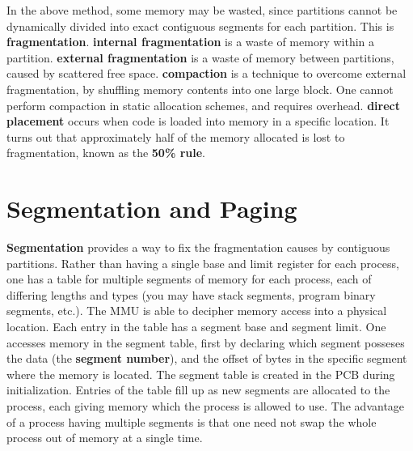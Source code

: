 In the above method, some memory may be wasted, since partitions cannot be dynamically divided into exact contiguous segments for each partition. This is {\bf fragmentation}. {\bf internal fragmentation} is a waste of memory within a partition. {\bf external fragmentation} is a waste of memory between partitions, caused by scattered free space. {\bf compaction} is a technique to overcome external fragmentation, by shuffling memory contents into one large block. One cannot perform compaction in static allocation schemes, and requires overhead. {\bf direct placement} occurs when code is loaded into memory in a specific location. It turns out that approximately half of the memory allocated is lost to fragmentation, known as the {\bf 50\% rule}.

\section{Segmentation and Paging}

{\bf Segmentation} provides a way to fix the fragmentation causes by contiguous partitions. Rather than having a single base and limit register for each process, one has a table for multiple segments of memory for each process, each of differing lengths and types (you may have stack segments, program binary segments, etc.). The MMU is able to decipher memory access into a physical location. Each entry in the table has a segment base and segment limit. One accesses memory in the segment table, first by declaring which segment posseses the data (the {\bf segment number}), and the offset of bytes in the specific segment where the memory is located. The segment table is created in the PCB during initialization. Entries of the table fill up as new segments are allocated to the process, each giving memory which the process is allowed to use. The advantage of a process having multiple segments is that one need not swap the whole process out of memory at a single time.

